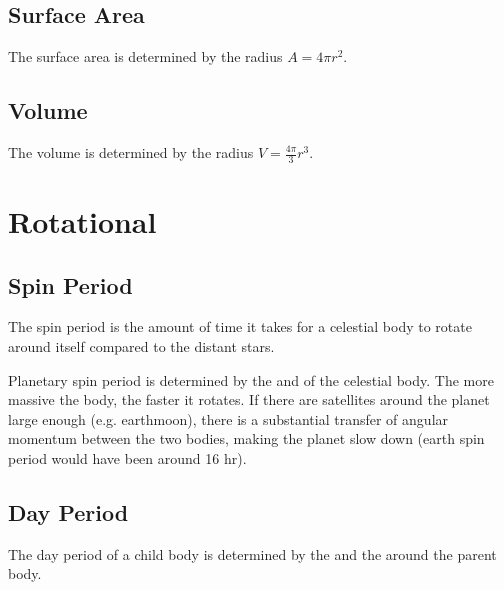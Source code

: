\documentclass[letterpaper,10pt,english]{sphinxmanual}
\begin{document}
\subsection{Surface Area}
\label{\detokenize{quantities/geometric/surface_area:surface-area}}\label{\detokenize{quantities/geometric/surface_area::doc}}\label{\detokenize{quantities/geometric/surface_area:id1}}
\sphinxAtStartPar
The surface area is determined by the radius \(A = 4 \pi r^2\).


\subsection{Volume}
\label{\detokenize{quantities/geometric/volume:volume}}\label{\detokenize{quantities/geometric/volume::doc}}\label{\detokenize{quantities/geometric/volume:id1}}
\sphinxAtStartPar
The volume is determined by the radius \(V = \frac{4\pi}{3}r^3\).


\section{Rotational}
\label{\detokenize{quantities/rotational/rotational:rotational}}\label{\detokenize{quantities/rotational/rotational::doc}}

\subsection{Spin Period}
\label{\detokenize{quantities/rotational/spin_period:spin-period}}\label{\detokenize{quantities/rotational/spin_period::doc}}\label{\detokenize{quantities/rotational/spin_period:id1}}
\sphinxAtStartPar
The spin period is the amount of time it takes for a celestial body to
rotate around itself compared to the distant stars.

\sphinxAtStartPar
Planetary spin period is determined by the {\hyperref[\detokenize{quantities/material/mass:id1}]{}} and {\hyperref[\detokenize{quantities/geometric/radius:id1}]{}} of the celestial body.
The more massive the body, the faster it rotates.
If there are satellites around the planet large enough
(e.g. earth\sphinxhyphen{}moon), there is a substantial transfer of
angular momentum between the two bodies, making the planet
slow down (earth spin period would have been around 16 hr).


\subsection{Day Period}
\label{\detokenize{quantities/rotational/day_period:day-period}}\label{\detokenize{quantities/rotational/day_period::doc}}\label{\detokenize{quantities/rotational/day_period:id1}}
\sphinxAtStartPar
The day period of a child body is determined by the {\hyperref[\detokenize{quantities/rotational/spin_period:id1}]{}}
and the {\hyperref[\detokenize{quantities/orbital/orbital_period:id1}]{}} around the parent body.
\end{document}
